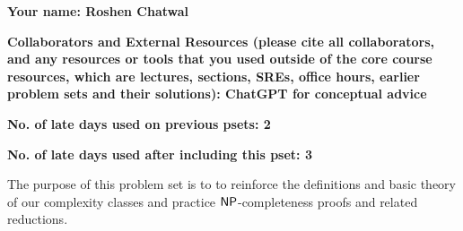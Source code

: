 \documentclass[11pt]{article}
\begin{document}


\textbf{Your name: Roshen Chatwal}

\textbf{Collaborators and External Resources (please cite all collaborators, and any resources or tools that you used outside of the core course resources, which are lectures, sections, SREs, office hours, earlier problem sets and their solutions): ChatGPT for conceptual advice}

\vspace{0.1in}


\textbf{No. of late days used on previous psets: 2}

\textbf{No. of late days used after including this pset: 3}


\vspace{0.2in}

\noindent The purpose of this problem set is to to reinforce the definitions and basic theory of our complexity classes and practice $\mathsf{NP}$-completeness proofs and related reductions. 
\end{document}

